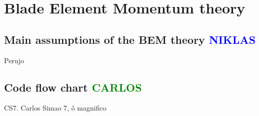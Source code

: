 \chapter{Blade Element Momentum theory}

\section{Main assumptions of the BEM theory \textcolor{blue}{NIKLAS}}

Perujo

\section{Code flow chart \textcolor{green}{CARLOS}}

CS7.    Carlos Simao 7, ô magnifico
